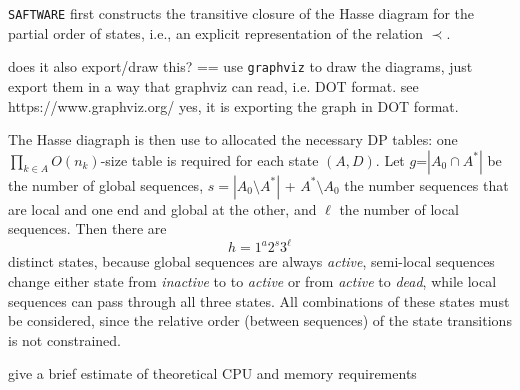 \documentclass[a4paper,10pt]{article}
\newcommand{\TODO}[1]{\begingroup\color{red}#1\endgroup}
\newcommand{\FK}[1]{\begingroup\color{blue}#1\endgroup}
\newcommand{\SAFTWARE}{\TODO{\texttt{SAFTWARE}}}
\begin{document}
\SAFTWARE{} first constructs the \FK{transitive closure of the} Hasse diagram for the partial order
of states, i.e., an explicit representation of the relation \FK{$\prec$}.

\TODO{does it also export/draw this? == use \texttt{graphviz} to draw the
  diagrams, just export them in a way that graphviz can read, i.e. DOT
  format. see https://www.graphviz.org/} \FK{yes, it is exporting the graph in DOT format.}

The Hasse diagraph is then use to allocated the necessary DP tables: one
$\prod_{k\in A} O(n_k)$-size table is required for each state $(A,D)$.  Let
$g$=$|A_0\cap A^*|$ be the number of global sequences,
$s=|A_0\setminus A^*|$ + $A^*\setminus A_0$ the number sequences that are
local and one end and global at the other, and $\ell$ the number of local
sequences. Then there are
\begin{equation}
  h = 1^a 2^s 3^{\ell} 
\end{equation} 
distinct states, because global sequences are always \textit{active},
semi-local sequences change either state from \textit{inactive} to to
\textit{active} or from \textit{active} to \textit{dead}, while local
sequences can pass through all three states. All combinations of these
states must be considered, since the relative order (between sequences) of
the state transitions is not constrained.





\TODO{give a brief estimate of theoretical CPU and memory requirements}
\end{document}
